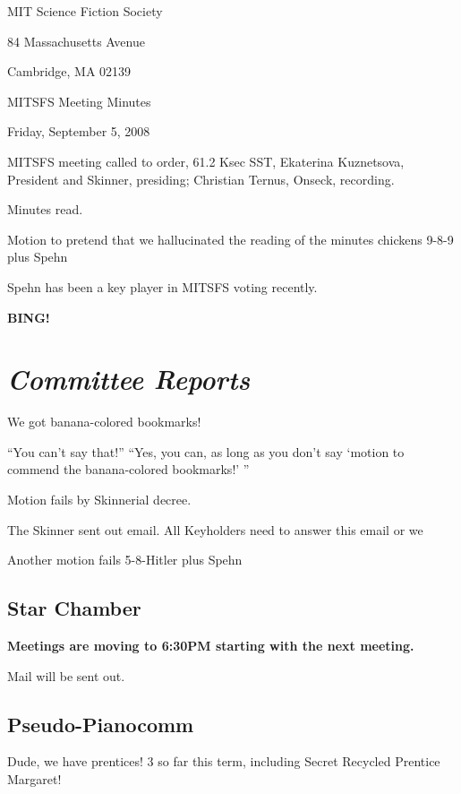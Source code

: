 \documentclass[10pt]{article}
\newcommand{\bing}{{\bf BING!} }
\newcommand{\goto}[1]{\bing \vskip 12pt \section*{{\em{#1}}}}
\newcommand{\ps}{ plus Spehn\xspace}
\begin{document}
\begin{center}

MIT Science Fiction Society

84 Massachusetts Avenue

Cambridge, MA 02139

\vspace{12pt}

MITSFS Meeting Minutes

Friday, September 5, 2008

\end{center}

\vspace{18pt}

\setlength{\parskip}{6pt}

\noindent
MITSFS meeting called to order, 61.2 Ksec SST,
Ekaterina Kuznetsova, President and Skinner, presiding; Christian Ternus, Onseck, recording.

Minutes read.

Motion to pretend that we hallucinated the reading of the minutes chickens 9-8-9 \ps

Spehn has been a key player in MITSFS voting recently.

\BING

\goto{Committee Reports}

We got banana-colored bookmarks!

``You can't say that!'' ``Yes, you can, as long as you don't say `motion to commend the banana-colored bookmarks!' ''

Motion fails by Skinnerial decree.

The Skinner sent out email.  All Keyholders need to answer this email or we 

Another motion fails 5-8-Hitler \ps

\subsection*{Star Chamber}

\textbf{Meetings are moving to 6:30PM starting with the next meeting.}
 
Mail will be sent out.

\subsection*{Pseudo-Pianocomm}

Dude, we have prentices!  3 so far this term, including Secret
Recycled Prentice Margaret!
\end{document}
